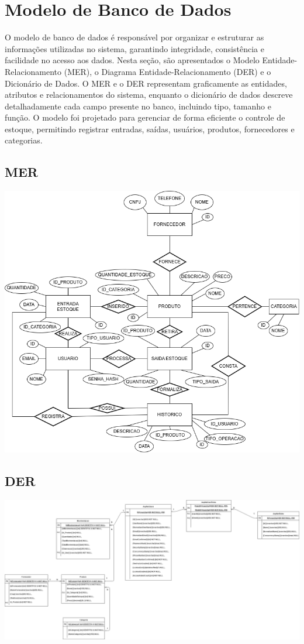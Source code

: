 \documentclass[
	12pt,				%
	openright,			%
	twoside,			%
	a4paper,			%
	english,			%
	french,				%
	spanish,			%
	brazil				%
	]{abntex2}
\begin{document}
\section{Modelo de Banco de Dados}

O modelo de banco de dados é responsável por organizar e estruturar as informações utilizadas no sistema, garantindo integridade, consistência e facilidade no acesso aos dados. Nesta seção, são apresentados o Modelo Entidade-Relacionamento (MER), o Diagrama Entidade-Relacionamento (DER) e o Dicionário de Dados. O MER e o DER representam graficamente as entidades, atributos e relacionamentos do sistema, enquanto o dicionário de dados descreve detalhadamente cada campo presente no banco, incluindo tipo, tamanho e função. O modelo foi projetado para gerenciar de forma eficiente o controle de estoque, permitindo registrar entradas, saídas, usuários, produtos, fornecedores e categorias.

\subsection{MER}

\includegraphics[width=1.0\textwidth]{Figuras/MERestoque.png}


\subsection{DER}

\includegraphics[width=1.0\textwidth]{Figuras/DERestoque.png}
\end{document}

